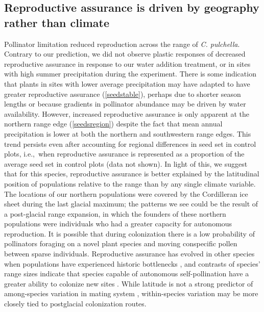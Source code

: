 \documentclass{article}
\begin{document}
\subsection*{Reproductive assurance is driven by geography rather than climate}

Pollinator limitation reduced reproduction across the range of \textit{C. pulchella}. Contrary to our prediction, we did not observe plastic responses of decreased reproductive assurance in response to our water addition treatment, or in sites with high summer precipitation during the experiment. There is some indication that plants in sites with lower average precipitation may have adapted to have greater reproductive assurance (\autoref{seedstable}), perhaps due to shorter season lengths or because gradients in pollinator abundance may be driven by water availability. However, increased reproductive assurance is only apparent at the northern range edge (\autoref{seedsregion}) despite the fact that mean annual precipitation is lower at both the northern and southwestern range edges. This trend persists even after accounting for regional differences in seed set in control plots, i.e.,\ when reproductive assurance is represented as a proportion of the average seed set in control plots (data not shown). In light of this, we suggest that for this species, reproductive assurance is better explained by the latitudinal position of populations relative to the range than by any single climate variable. The locations of our northern populations were covered by the Cordilleran ice sheet during the last glacial maximum; the patterns we see could be the result of a post-glacial range expansion, in which the founders of these northern populations were individuals who had a greater capacity for autonomous reproduction. It is possible that during colonization there is a low probability of pollinators foraging on a novel plant species and moving conspecific pollen between sparse individuals. Reproductive assurance has evolved in other species when populations have experienced historic bottlenecks \citep{busch2005evolution}, and contrasts of species' range sizes indicate that species capable of autonomous self-pollination have a greater ability to colonize new sites \citep{randle2009can}. While latitude is not a strong predictor of among-species variation in mating system \citep{moeller2017}, within-species variation may be more closely tied to postglacial colonization routes.
\end{document}
